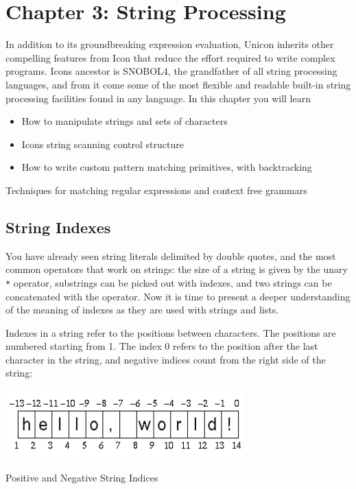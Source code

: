 \clearpage\section{Chapter 3: String Processing}

In addition to its groundbreaking expression evaluation, Unicon inherits
other compelling features from Icon that reduce the effort required to
write complex programs. Icon{\textquotesingle}s ancestor is
SNOBOL4, the grandfather of all string processing
languages, and from it come some of the most flexible and readable
built-in string processing facilities found in any language. In this
chapter you will learn

\begin{itemize}
\item How to manipulate strings and sets of characters
\item Icon{\textquotesingle}s string scanning control structure
\item How to write custom pattern matching
primitives, with backtracking
\end{itemize}
Techniques for matching regular expressions and context free grammars

\subsection{String Indexes}

You have already seen string literals delimited by double quotes, and
the most common operators that work on strings: the size of a string is
given by the unary \texttt{*} operator, substrings can be picked out
with indexes, and two strings can be concatenated with the
\texttt{{\textbar}{\textbar}} operator. Now it is time to present a
deeper understanding of the meaning of indexes as they are used with
strings and lists.

Indexes in a string refer to the positions
between characters. The positions are numbered starting from 1. The
index 0 refers to the position after the last character in the string,
and negative indices count from the right side of the string:


\begin{center}
\includegraphics[width=3.6075in,height=1.0417in]{ub-img/ub-img7.png}
\end{center}
\vspace{-0.25cm}{\sffamily\bfseries Figure 3-1:}
{\sffamily Positive and Negative String Indices}

